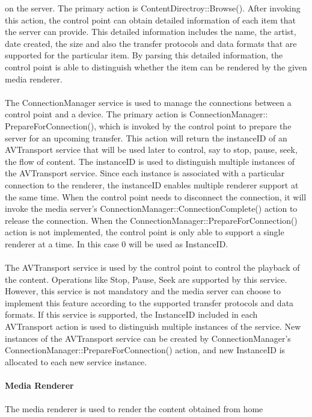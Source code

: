 on the server. The primary action is ContentDirectroy::Browse(). After 
invoking this action, the control point can obtain detailed information of each 
item that the server can provide. This detailed information includes the name, 
the artist, date created, the size and also the transfer protocols and data formats that are
supported for the particular item. By parsing this detailed information, 
the control point is able to distinguish whether the item can be rendered by the 
given media renderer. \\
\\
The ConnectionManager service is used to manage the connections between a 
control point and a device. The primary action is 
ConnectionManager:: PrepareForConnection(), which is invoked by the control 
point to prepare the server for an upcoming transfer. This 
action will return the instanceID of an AVTransport service that will be used 
later to control, say to stop, pause, seek, the flow of content. The instanceID is used to distinguish multiple instances of the AVTransport service. Since each instance is associated with a particular connection to the renderer, the instanceID enables multiple renderer support at the same time. When the 
control point needs to disconnect the connection, it will invoke the media 
server's ConnectionManager::ConnectionComplete() action to release the 
connection. When the ConnectionManager::PrepareForConnection() action is not 
implemented, the control point is only able to support a single renderer at a 
time. In this case 0 will be used as InstanceID. \\
\\
The AVTransport service is used by the control point to control the playback of the 
content. Operations like Stop, Pause, Seek are supported by this service. However, this 
service is not mandatory and the media server can choose to implement this feature 
according to the supported transfer protocols and data formats. If this service 
is supported, the InstanceID included in each AVTransport action is used to 
distinguish multiple instances of the service. New instances of the AVTransport 
service can be created by ConnectionManager's 
ConnectionManager::PrepareForConnection() action, and new InstanceID is 
allocated to each new service instance. \\
\\
\textbf{Media Renderer} \\ 
\\
The media renderer is used to render the content obtained from home 

